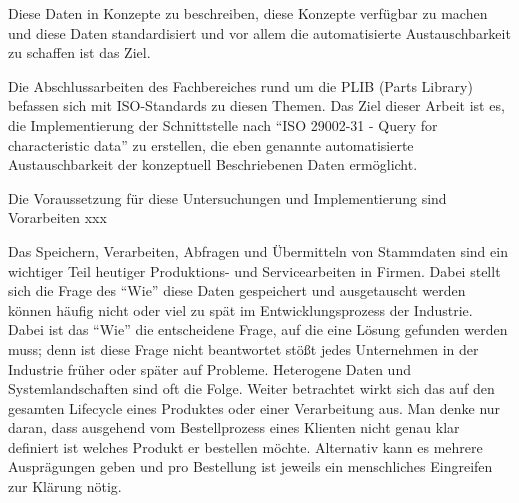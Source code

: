Diese Daten in Konzepte zu beschreiben, diese Konzepte verfügbar zu machen und diese Daten standardisiert und vor allem die automatisierte Austauschbarkeit zu schaffen ist das Ziel. 

Die Abschlussarbeiten des Fachbereiches rund um die PLIB (Parts Library) befassen sich mit ISO-Standards zu diesen Themen. Das Ziel dieser Arbeit ist es, die Implementierung der Schnittstelle nach \enquote{ISO 29002-31 - Query for characteristic data} zu erstellen, die eben genannte automatisierte Austauschbarkeit der konzeptuell Beschriebenen Daten ermöglicht. 

Die Voraussetzung für diese Untersuchungen und Implementierung sind Vorarbeiten xxx

Das Speichern, Verarbeiten, Abfragen und Übermitteln von Stammdaten sind ein wichtiger Teil heutiger Produktions- und Servicearbeiten in Firmen. Dabei stellt sich die Frage des \enquote{Wie} diese Daten gespeichert und ausgetauscht werden können häufig nicht oder viel zu spät im Entwicklungsprozess der Industrie. Dabei ist das  \enquote{Wie} die entscheidene Frage, auf die eine Lösung gefunden werden muss; denn ist diese Frage nicht beantwortet stößt jedes Unternehmen in der Industrie früher oder später auf Probleme. Heterogene Daten und Systemlandschaften sind oft die Folge. Weiter betrachtet wirkt sich das auf den gesamten Lifecycle eines Produktes oder einer Verarbeitung aus. Man denke nur daran, dass ausgehend vom Bestellprozess eines Klienten nicht genau klar definiert ist welches Produkt er bestellen möchte. Alternativ kann es mehrere Ausprägungen geben und pro Bestellung ist jeweils ein menschliches Eingreifen zur Klärung nötig. 


